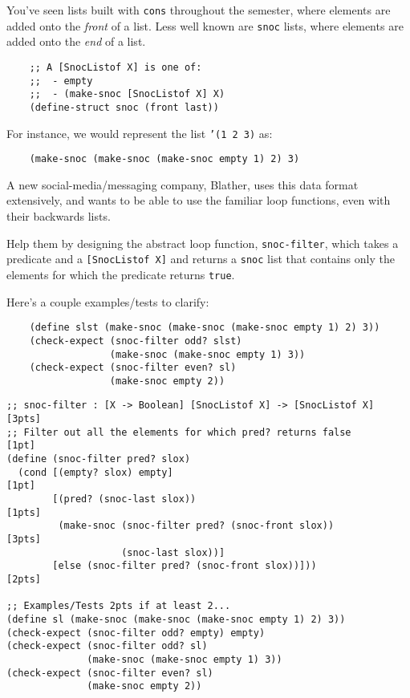 \documentclass[12pt]{article}                   %
\def\pts#1{\marginpar{\footnotesize \raggedright  \fbox{#1 {\sc Points}}}}
\newenvironment{solution}{}{}
\newcommand\code[1]{\texttt{#1}}
\begin{document}
\begin{problem} \pts{13}
You've seen lists built with \code{cons} throughout the semester,
where elements are added onto the \textit{front} of a list.  Less well
known are \code{snoc} lists, where elements are added onto the
\emph{end} of a list.

\begin{verbatim}
    ;; A [SnocListof X] is one of:
    ;;  - empty
    ;;  - (make-snoc [SnocListof X] X)
    (define-struct snoc (front last))
\end{verbatim}

\noindent For instance, we would represent the list \texttt{'(1 2 3)}
as:

\begin{verbatim}
    (make-snoc (make-snoc (make-snoc empty 1) 2) 3)
\end{verbatim}


\noindent A new social-media/messaging company, Blather,
uses this data format
extensively, and wants to be able to use the familiar loop functions,
even with their backwards lists.

Help them by designing the abstract loop function,
\texttt{snoc-filter}, which takes a predicate and a
\texttt{[SnocListof X]} and returns a \code{snoc} list that contains
only the elements for which the predicate returns \texttt{true}.

\bigskip

\noindent Here's a couple examples/tests to clarify:
\begin{verbatim}
    (define slst (make-snoc (make-snoc (make-snoc empty 1) 2) 3))
    (check-expect (snoc-filter odd? slst)
                  (make-snoc (make-snoc empty 1) 3))
    (check-expect (snoc-filter even? sl)
                  (make-snoc empty 2))
\end{verbatim}



\begin{solution}
\begin{verbatim}
;; snoc-filter : [X -> Boolean] [SnocListof X] -> [SnocListof X]  [3pts]
;; Filter out all the elements for which pred? returns false      [1pt]
(define (snoc-filter pred? slox)
  (cond [(empty? slox) empty]                                     [1pt]
        [(pred? (snoc-last slox))                                 [1pts]
         (make-snoc (snoc-filter pred? (snoc-front slox))         [3pts]
                    (snoc-last slox))]
        [else (snoc-filter pred? (snoc-front slox))]))            [2pts]

;; Examples/Tests 2pts if at least 2...
(define sl (make-snoc (make-snoc (make-snoc empty 1) 2) 3))
(check-expect (snoc-filter odd? empty) empty)
(check-expect (snoc-filter odd? sl)
              (make-snoc (make-snoc empty 1) 3))
(check-expect (snoc-filter even? sl)
              (make-snoc empty 2))
\end{verbatim}
\end{solution}
\end{problem}
\end{document}
